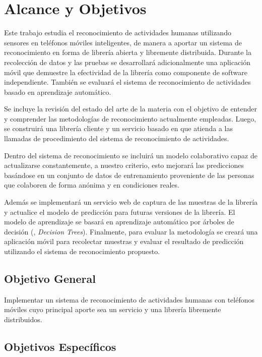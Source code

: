 \section{Alcance y Objetivos}

\label{alcance-y-objetivos}

Este trabajo estudia el reconocimiento de actividades humanas utilizando
sensores en teléfonos móviles inteligentes, de manera a aportar un
sistema de reconocimiento en forma de librería abierta y libremente
distribuida. Durante la recolección de datos y las pruebas se desarrollará
adicionalmente una aplicación móvil que demuestre la efectividad de
la librería como componente de software independiente. También se
evaluará el sistema de reconocimiento de actividades basado en aprendizaje
automático.

Se incluye la revisión del estado del arte de la materia con el objetivo
de entender y comprender las metodologías de reconocimiento actualmente
empleadas. Luego, se construirá una librería cliente y un servicio
basado en \emph{} que atienda a las llamadas de procedimiento
del sistema de reconocimiento de actividades. 

Dentro del sistema de reconocimiento se incluirá un modelo colaborativo
capaz de actualizarse constantemente, a nuestro criterio, esto mejorará
las predicciones basándose en un conjunto de datos de entrenamiento
proveniente de las personas que colaboren de forma anónima y en condiciones
reales.

Además se implementará un servicio web de captura de las muestras
de la librería y actualice el modelo de predicción para futuras versiones
de la librería. El modelo de aprendizaje se basará en aprendizaje
automático por árboles de decisión (, \emph{Decision Trees}).
Finalmente, para evaluar la metodología se creará una aplicación móvil
para recolectar muestras y evaluar el resultado de predicción utilizando
el sistema de reconocimiento propuesto.

\subsection{Objetivo General}

\label{objetivo-general}

Implementar un sistema de reconocimiento de actividades humanas con
teléfonos móviles cuyo principal aporte sea un servicio y una librería
libremente distribuidos.

\subsection{Objetivos Específicos}

